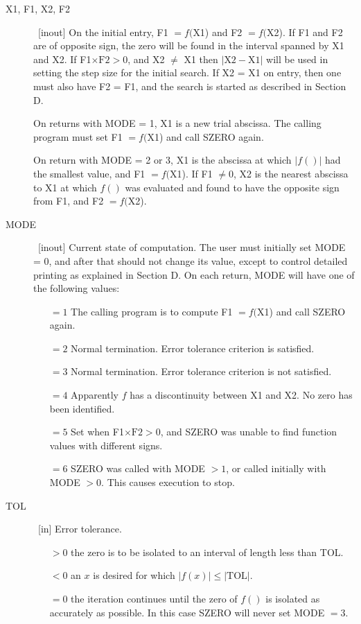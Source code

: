 \documentclass[twoside]{MATH77}
\begin{document}
\begin{description}

\item[X1, F1, X2, F2] \ [inout] On the initial entry, F1 $= f($X1) and F2
$= f($X2).  If F1 and F2 are of opposite sign, the zero will be found in
the interval spanned by X1 and X2.  If F1$\times \text{F2} > 0$, and X2
$\neq$ X1 then $|\text{X2}-\text{X1}|$ will be used in setting the step
size for the initial search.  If X2 = X1 on entry, then one must also have
F2 = F1, and the search is started as described in Section D.

On returns with MODE = 1, X1 is a new trial abscissa. The calling program
must set F1 $= f($X1) and call SZERO again.

On return with MODE = 2 or 3, X1 is the abscissa at which $|f()|$ had the
smallest value, and F1 $= f($X1). If F1 $\neq 0$, X2 is the nearest abscissa
to X1 at which $f()$ was evaluated and found to have the opposite sign from
F1, and F2 $= f($X2).

\item[MODE] \ [inout] Current state of computation. The user must initially set MODE
= 0, and after that should not change its value, except to control detailed
printing as explained in Section D. On each return, MODE will have one of
the following values:
\begin{itemize}
\item[$= 1$] The calling program is to compute F1 $= f($X1) and call SZERO again.

\item[$= 2$] Normal termination. Error tolerance criterion is satisfied.

\item[$= 3$] Normal termination. Error tolerance criterion is not satisfied.

\item[$= 4$] Apparently $f$ has a discontinuity between X1 and X2. No zero has been
identified.

\item[$= 5$] Set when F1$\times \text{F2} > 0$, and SZERO was unable to find function
values with different signs.

\item[$= 6$] SZERO was called with MODE $> 1$, or called initially with MODE $> 0$.
This causes execution to stop.
\end{itemize}
\item[TOL] \ [in] Error tolerance.
\begin{itemize}
\item[$>0$] the zero is to be isolated to an interval of length less than TOL.

\item[$<0$] an $x$ is desired for which $|f(x)|%
\leq |\text{TOL}|.$

\item[$=0$] the iteration continues until the zero of $f()$ is isolated as
accurately as possible. In this case SZERO will never set MODE $= 3.$
\end{itemize}
\end{description}
\end{document}
